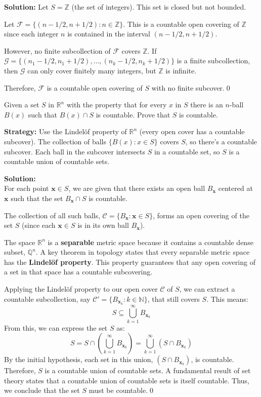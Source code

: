 \bigskip\noindent\textbf{Solution:} Let $S = \mathbb{Z}$ (the set of integers). This set is closed but not bounded.

Let $\mathcal{F} = \{(n-1/2, n+1/2) : n \in \mathbb{Z}\}$. This is a countable open covering of $\mathbb{Z}$ since each integer $n$ is contained in the interval $(n-1/2, n+1/2)$.

However, no finite subcollection of $\mathcal{F}$ covers $\mathbb{Z}$. If $\mathcal{G} = \{(n_1-1/2, n_1+1/2), \ldots, (n_k-1/2, n_k+1/2)\}$ is a finite subcollection, then $\mathcal{G}$ can only cover finitely many integers, but $\mathbb{Z}$ is infinite.

Therefore, $\mathcal{F}$ is a countable open covering of $S$ with no finite subcover.\qed


\begin{problembox}
Given a set \( S \) in \( \mathbb{R}^n \) with the property that for every \( x \) in \( S \) there is an \( n \)-ball \( B(x) \) such that \( B(x) \cap S \) is countable. Prove that \( S \) is countable.
\end{problembox}

\noindent\textbf{Strategy:} Use the Lindelöf property of $\mathbb{R}^n$ (every open cover has a countable subcover). The collection of balls $\{B(x) : x \in S\}$ covers $S$, so there's a countable subcover. Each ball in the subcover intersects $S$ in a countable set, so $S$ is a countable union of countable sets.

\bigskip\noindent\textbf{Solution:}\\
For each point $\mathbf{x} \in S$, we are given that there exists an open ball $B_\mathbf{x}$ centered at $\mathbf{x}$ such that the set $B_\mathbf{x} \cap S$ is countable.

The collection of all such balls, $\mathcal{C} = \{B_\mathbf{x} : \mathbf{x} \in S\}$, forms an open covering of the set $S$ (since each $\mathbf{x} \in S$ is in its own ball $B_\mathbf{x}$).

The space $\mathbb{R}^n$ is a \textbf{separable} metric space because it contains a countable dense subset, $\mathbb{Q}^n$. A key theorem in topology states that every separable metric space has the \textbf{Lindelöf property}. This property guarantees that any open covering of a set in that space has a countable subcovering.

Applying the Lindelöf property to our open cover $\mathcal{C}$ of $S$, we can extract a countable subcollection, say $\mathcal{C}' = \{B_{\mathbf{x}_k} : k \in \mathbb{N}\}$, that still covers $S$. This means:
$$S \subseteq \bigcup_{k=1}^{\infty} B_{\mathbf{x}_k}$$
From this, we can express the set $S$ as:
$$S = S \cap \left( \bigcup_{k=1}^{\infty} B_{\mathbf{x}_k} \right) = \bigcup_{k=1}^{\infty} (S \cap B_{\mathbf{x}_k})$$
By the initial hypothesis, each set in this union, $(S \cap B_{\mathbf{x}_k})$, is countable.
Therefore, $S$ is a countable union of countable sets. A fundamental result of set theory states that a countable union of countable sets is itself countable. Thus, we conclude that the set $S$ must be countable.\qed


